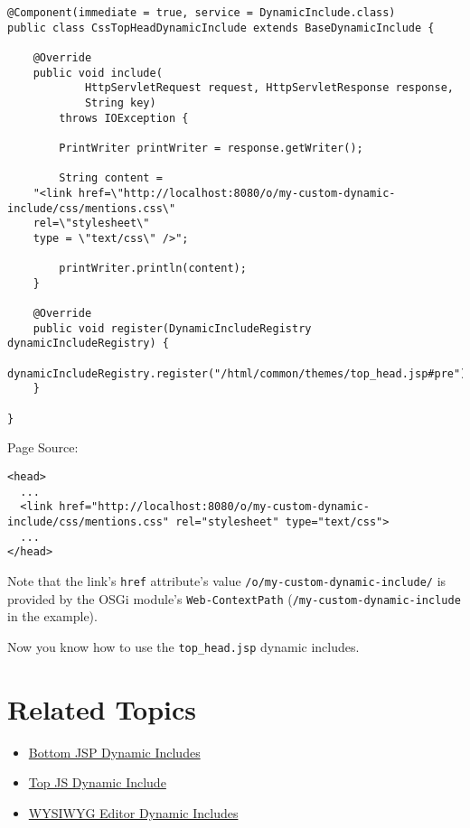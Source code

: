 \begin{verbatim}
@Component(immediate = true, service = DynamicInclude.class)
public class CssTopHeadDynamicInclude extends BaseDynamicInclude {

    @Override
    public void include(
            HttpServletRequest request, HttpServletResponse response,
            String key)
        throws IOException {

        PrintWriter printWriter = response.getWriter();

        String content = 
    "<link href=\"http://localhost:8080/o/my-custom-dynamic-include/css/mentions.css\" 
    rel=\"stylesheet\" 
    type = \"text/css\" />";
    
        printWriter.println(content);
    }

    @Override
    public void register(DynamicIncludeRegistry dynamicIncludeRegistry) {
        dynamicIncludeRegistry.register("/html/common/themes/top_head.jsp#pre");
    }
  
}
\end{verbatim}

Page Source:

\begin{verbatim}
<head>
  ...
  <link href="http://localhost:8080/o/my-custom-dynamic-include/css/mentions.css" rel="stylesheet" type="text/css">
  ...
</head>
\end{verbatim}

Note that the link's \texttt{href} attribute's value
\texttt{/o/my-custom-dynamic-include/} is provided by the OSGi module's
\texttt{Web-ContextPath} (\texttt{/my-custom-dynamic-include} in the
example).

Now you know how to use the \texttt{top\_head.jsp} dynamic includes.

\section{Related Topics}\label{related-topics-21}

\begin{itemize}
\tightlist
\item
  \href{/docs/7-2/customization/-/knowledge_base/c/bottom-jsp-dynamic-includes}{Bottom
  JSP Dynamic Includes}
\item
  \href{/docs/7-2/customization/-/knowledge_base/c/top-js-dynamic-include}{Top
  JS Dynamic Include}
\item
  \href{/docs/7-2/customization/-/knowledge_base/c/wysiwyg-editor-dynamic-includes}{WYSIWYG
  Editor Dynamic Includes}
\end{itemize}

